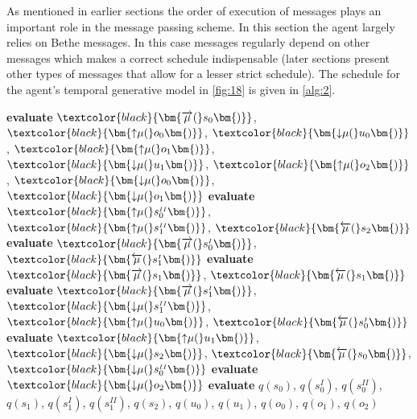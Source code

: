 As mentioned in earlier sections the order of execution of messages plays an important role in the message passing scheme. In this section the agent largely relies on Bethe messages. In this case messages regularly depend on other messages which makes a correct schedule indispensable (later sections present other types of messages that allow for a lesser strict schedule). The schedule for the agent's temporal generative model in \cref{fig:18} is given in \cref{alg:2}.
\begin{algorithm}[htbp]
    \caption{Message Passing Algorithm of the BFE Agent}
    \label{alg:2}
    \begin{algorithmic}[1] %
        \State \textbf{evaluate} $\textcolor{black}{\bm{\overrightarrow{\mu}(}s_0\bm{)}}$, $\textcolor{black}{\bm{{\uparrow}{\mu}(}o_0\bm{)}}$, $\textcolor{black}{\bm{{\downarrow}{\mu}(}u_0\bm{)}}$, $\textcolor{black}{\bm{{\uparrow}{\mu}(}o_1\bm{)}}$, $\textcolor{black}{\bm{{\downarrow}{\mu}(}u_1\bm{)}}$, $\textcolor{black}{\bm{{\uparrow}{\mu}(}o_2\bm{)}}$, $\textcolor{black}{\bm{{\downarrow}{\mu}(}o_0\bm{)}}$, $\textcolor{black}{\bm{{\downarrow}{\mu}(}o_1\bm{)}}$
        \State \textbf{evaluate} $\textcolor{black}{\bm{{\uparrow}{\mu}(}s^{\scriptscriptstyle II}_0\bm{)}}$, $\textcolor{black}{\bm{{\uparrow}{\mu}(}s^{\scriptscriptstyle II}_1\bm{)}}$, $\textcolor{black}{\bm{\overleftarrow{\mu}(}s_2\bm{)}}$
        \State \textbf{evaluate} $\textcolor{black}{\bm{\overrightarrow{\mu}(}s^{\scriptscriptstyle I}_0\bm{)}}$, $\textcolor{black}{\bm{\overleftarrow{\mu}(}s^{\scriptscriptstyle I}_1\bm{)}}$
        \State \textbf{evaluate} $\textcolor{black}{\bm{\overrightarrow{\mu}(}s_1\bm{)}}$, $\textcolor{black}{\bm{\overleftarrow{\mu}(}s_1\bm{)}}$
        \State \textbf{evaluate} $\textcolor{black}{\bm{\overrightarrow{\mu}(}s^{\scriptscriptstyle I}_1\bm{)}}$, $\textcolor{black}{\bm{{\downarrow}{\mu}(}s^{\scriptscriptstyle II}_1\bm{)}}$, $\textcolor{black}{\bm{{\uparrow}{\mu}(}u_0\bm{)}}$, $\textcolor{black}{\bm{\overleftarrow{\mu}(}s^{\scriptscriptstyle I}_0\bm{)}}$
        \State \textbf{evaluate} $\textcolor{black}{\bm{{\uparrow}{\mu}(}u_1\bm{)}}$, $\textcolor{black}{\bm{{\downarrow}{\mu}(}s_2\bm{)}}$, $\textcolor{black}{\bm{\overleftarrow{\mu}(}s_0\bm{)}}$, $\textcolor{black}{\bm{{\downarrow}{\mu}(}s^{\scriptscriptstyle II}_0\bm{)}}$
        \State \textbf{evaluate} $\textcolor{black}{\bm{{\downarrow}{\mu}(}o_2\bm{)}}$
        \State \textbf{evaluate} $q(s_0)$, $q(s^{\scriptscriptstyle I}_0)$, $q(s^{\scriptscriptstyle II}_0)$, $q(s_1)$, $q(s^{\scriptscriptstyle I}_1)$, $q(s^{\scriptscriptstyle II}_1)$, $q(s_2)$, $q(u_0)$, $q(u_1)$, $q(o_0)$, $q(o_1)$,
        \Statex {}$q(o_2)$
    \end{algorithmic}
\end{algorithm}